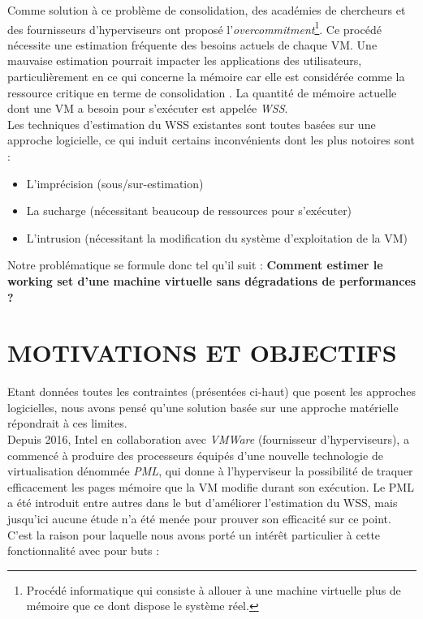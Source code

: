 \noindent Comme solution à ce problème de consolidation, des académies de chercheurs et des fournisseurs d'hyperviseurs ont proposé l'\emph{overcommitment}\footnote{Procédé informatique qui consiste à allouer à une machine virtuelle plus de mémoire que ce dont dispose le système réel.}. Ce procédé nécessite une estimation fréquente des besoins actuels de chaque VM. Une mauvaise estimation pourrait impacter les applications des utilisateurs, particulièrement en ce qui concerne la mémoire car elle est considérée comme la ressource critique en terme de consolidation \cite{datacenter}. La quantité de mémoire actuelle dont une VM a besoin pour s'exécuter est appelée \textit{\ac{WSS}}.\\
Les techniques d'estimation du WSS existantes sont toutes basées sur une approche logicielle, ce qui induit certains inconvénients dont les plus notoires sont : 

\begin{itemize}[label=, font=\large \color{darkorange}]
    \item L'imprécision (sous/sur-estimation)
    \item La sucharge (nécessitant beaucoup de ressources pour s'exécuter)
    \item L'intrusion (nécessitant la modification du système d'exploitation de la VM)
\end{itemize}

\noindent Notre problématique se formule donc tel qu'il suit : \textbf{Comment estimer le working set d'une machine virtuelle sans dégradations de performances ?}

\section*{MOTIVATIONS ET OBJECTIFS}

Etant données toutes les contraintes (présentées ci-haut) que posent les approches logicielles, nous avons pensé qu'une solution basée sur une approche matérielle répondrait à ces limites.\\
Depuis 2016, Intel en collaboration avec \emph{VMWare} (fournisseur d'hyperviseurs), a commencé à produire des processeurs équipés d'une nouvelle technologie de virtualisation dénommée \textit{\ac{PML}}, qui donne à l'hyperviseur la possibilité de traquer efficacement les pages mémoire que la VM modifie durant son exécution\cite{online5}. Le PML a été introduit entre autres dans le but d'améliorer l'estimation du WSS, mais jusqu'ici aucune étude n'a été menée pour prouver son efficacité sur ce point. C'est la raison pour laquelle nous avons porté un intérêt particulier à cette fonctionnalité avec pour buts :

